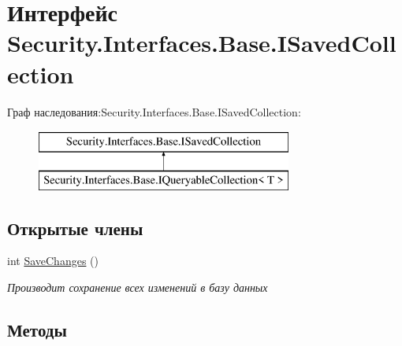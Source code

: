 \hypertarget{interface_security_1_1_interfaces_1_1_base_1_1_i_saved_collection}{}\section{Интерфейс Security.\+Interfaces.\+Base.\+I\+Saved\+Collection}
\label{interface_security_1_1_interfaces_1_1_base_1_1_i_saved_collection}
Граф наследования\+:Security.\+Interfaces.\+Base.\+I\+Saved\+Collection\+:\begin{figure}[H]
\begin{center}
\leavevmode
\includegraphics[height=2.000000cm]{d4/d3b/interface_security_1_1_interfaces_1_1_base_1_1_i_saved_collection}
\end{center}
\end{figure}
\subsection*{Открытые члены}
\begin{DoxyCompactItemize}
\item 
int \hyperlink{interface_security_1_1_interfaces_1_1_base_1_1_i_saved_collection_ae025187309115a493c44533c35045129}{Save\+Changes} ()
\begin{DoxyCompactList}\small\item\em Производит сохранение всех изменений в базу данных \end{DoxyCompactList}\end{DoxyCompactItemize}


\subsection{Методы}
\mbox{\label{interface_security_1_1_interfaces_1_1_base_1_1_i_saved_collection_ae025187309115a493c44533c35045129}} 
